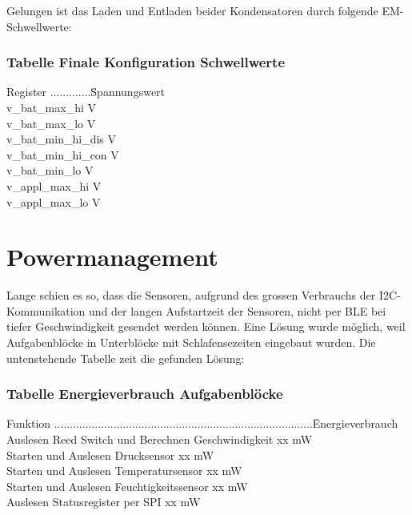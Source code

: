Gelungen ist das Laden und Entladen beider Kondensatoren durch folgende EM-Schwellwerte:

\subsubsection*{Tabelle Finale Konfiguration Schwellwerte }
\begin{tabbing}
    Register .............\quad\= Spannungswert \\[0.8ex]
    v\_bat\_max\_hi        V \\
    v\_bat\_max\_lo        V \\
    v\_bat\_min\_hi\_dis   V \\
    v\_bat\_min\_hi\_con   V \\
    v\_bat\_min\_lo        V \\
    v\_appl\_max\_hi       V \\
    v\_appl\_max\_lo       V \\   
\end{tabbing}  



\section{Powermanagement}

Lange schien es so, dass die Sensoren, aufgrund des grossen Verbrauchs der I2C-Kommunikation und der langen Aufstartzeit der Sensoren, nicht per BLE bei tiefer Geschwindigkeit gesendet werden können. Eine Lösung wurde möglich, weil Aufgabenblöcke in Unterblöcke mit Schlafensezeiten eingebaut wurden. Die untenstehende Tabelle zeit die gefunden Lösung:

\subsubsection*{Tabelle Energieverbrauch Aufgabenblöcke}
\begin{tabbing}
    Funktion ...................................................................................\quad\= Energieverbrauch \\[0.8ex]
    Auslesen Reed Switch und Berechnen Geschwindigkeit       \> xx mW \\
    Starten und Auslesen Drucksensor          \> xx mW \\
    Starten und Auslesen Temperatursensor     \> xx mW \\
    Starten und Auslesen Feuchtigkeitssensor  \> xx mW \\
    Auslesen Statusregister per SPI           \> xx mW \\
\end{tabbing}  


